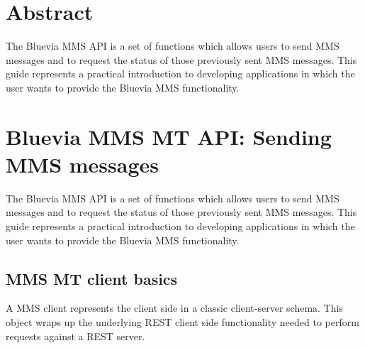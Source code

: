 \hypertarget{blv_mms_mt_guide_mms_mt_abstract_sec}{}\section{Abstract}\label{blv_mms_mt_guide_mms_mt_abstract_sec}
The Bluevia MMS API is a set of functions which allows users to send MMS messages and to request the status of those previously sent MMS messages. This guide represents a practical introduction to developing applications in which the user wants to provide the Bluevia MMS functionality.\hypertarget{blv_mms_mt_guide_blv_mms_mt_api_sending_mms_messages_sec}{}\section{Bluevia MMS MT API: Sending MMS messages}\label{blv_mms_mt_guide_blv_mms_mt_api_sending_mms_messages_sec}
The Bluevia MMS API is a set of functions which allows users to send MMS messages and to request the status of those previously sent MMS messages. This guide represents a practical introduction to developing applications in which the user wants to provide the Bluevia MMS functionality.\hypertarget{blv_mms_mt_guide_mms_mt_client_basics_sec}{}\subsection{MMS MT client basics}\label{blv_mms_mt_guide_mms_mt_client_basics_sec}
A MMS client represents the client side in a classic client-\/server schema. This object wraps up the underlying REST client side functionality needed to perform requests against a REST server.

